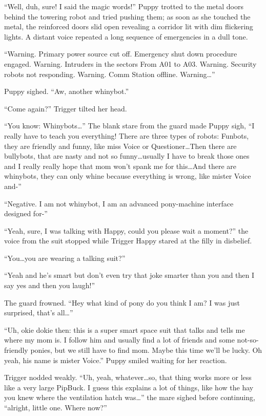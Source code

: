 ``Well, duh, sure! I said the magic words!'' Puppy trotted to the metal doors behind the towering robot and tried pushing them; as soon as she touched the metal, the reinforced doors slid open revealing a corridor lit with dim flickering lights. A distant voice repeated a long sequence of emergencies in a dull tone.

``{\mt Warning. Primary power source cut off. Emergency shut down procedure engaged. Warning. Intruders in the sectors From A01 to A03. Warning. Security robots not responding. Warning. Comm Station offline. Warning\dots}''

Puppy sighed. ``Aw, another whinybot.''

``Come again?'' Trigger tilted her head.

``You know: Whinybots\dots'' The blank stare from the guard made Puppy sigh, ``I really have to teach you everything! There are three types of robots: Funbots, they are friendly and funny, like miss Voice or Questioner\dots Then there are bullybots, that are nasty and not so funny\dots usually I have to break those ones and I really really hope that mom won't spank me for this\dots And there are whinybots, they can only whine because everything is wrong, like mister Voice and-''

``{\mt Negative. I am not whinybot, I am an advanced pony-machine interface designed for-}''

``Yeah, sure, I was talking with Happy, could you please wait a moment?'' the voice from the suit stopped while Trigger Happy stared at the filly in disbelief.

``You\dots you are wearing a talking suit?''

``Yeah and he's smart but don't even try that joke smarter than you and then I say yes and then you laugh!''

The guard frowned. ``Hey what kind of pony do you think I am? I was just surprised, that's all\dots''

``Uh, okie dokie then: this is a super smart space suit that talks and tells me where my mom is. I follow him and usually find a lot of friends and some not-so-friendly ponies, but we still have to find mom. Maybe this time we'll be lucky. Oh yeah, his name is mister Voice.'' Puppy smiled waiting for her reaction.

Trigger nodded weakly. ``Uh, yeah, whatever\dots so, that thing works more or less like a very large PipBuck. I guess this explains a lot of things, like how the hay you knew where the ventilation hatch was\dots'' the mare sighed before continuing, ``alright, little one. Where now?''

